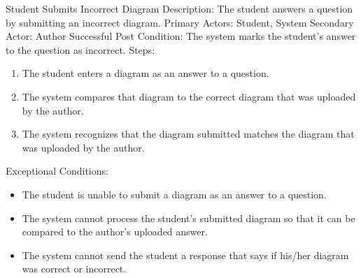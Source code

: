     \begin{section}{Student Submits Incorrect Diagram}
        Description: The student answers a question by submitting an incorrect diagram. \newline
        Primary Actors: Student, System \newline
        Secondary Actor: Author \newline
        Successful Post Condition: The system marks the student's answer to the question as incorrect. \newline
        Steps:
        \begin{enumerate}
            \item{The student enters a diagram as an answer to a question.}
            \item{The system compares that diagram to the correct diagram that was uploaded by the author.}
            \item{The system recognizes that the diagram submitted matches the diagram that was uploaded by the author.}
        \end{enumerate}
        Exceptional Conditions:
        \begin{itemize}
            \item{The student is unable to submit a diagram as an answer to a question.}
            \item{The system cannot process the student's submitted diagram so that it can be compared to the author's uploaded answer.}
            \item{The system cannot send the student a response that says if his/her diagram was correct or incorrect.}
        \end{itemize}
    \end{section}
    
